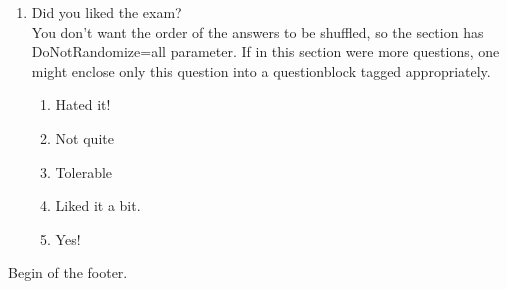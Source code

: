 \documentclass[a4paper,10pt]{article}%
\begin{document}
\begin{enumerate}[resume]
	
\item  Did you liked the exam? \\You don't want the order of the answers to be shuffled, so the section has DoNotRandomize=all parameter. If in this section were more questions, one might enclose only this question into a questionblock tagged appropriately.
	
\begin{enumerate}
\item  Hated it! %
		\item  Not quite
		\item  Tolerable
		\item  Liked it a bit.
		\item  Yes!
	\end{enumerate}
\end{enumerate}
%
Begin of the footer.
\end{document}
